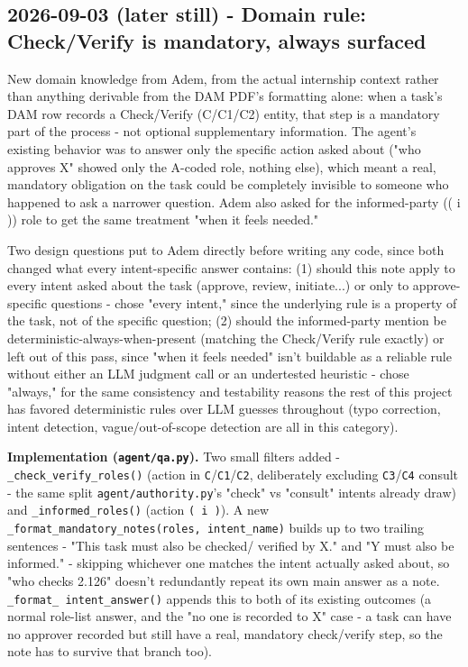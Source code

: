 \subsection*{2026-09-03 (later still) - Domain rule: Check/Verify is mandatory, always surfaced}
New domain knowledge from Adem, from the actual internship context rather than anything derivable from the DAM PDF's formatting alone: when a task's DAM row records a Check/Verify (C/C1/C2) entity, that step is a mandatory part of the process - not optional supplementary information. The agent's existing behavior was to answer only the specific action asked about ("who approves X" showed only the A-coded role, nothing else), which meant a real, mandatory obligation on the task could be completely invisible to someone who happened to ask a narrower question. Adem also asked for the informed-party (( i )) role to get the same treatment "when it feels needed."

Two design questions put to Adem directly before writing any code, since both changed what every intent-specific answer contains: (1) should this note apply to every intent asked about the task (approve, review, initiate...) or only to approve-specific questions - chose "every intent," since the underlying rule is a property of the task, not of the specific question; (2) should the informed-party mention be deterministic-always-when-present (matching the Check/Verify rule exactly) or left out of this pass, since "when it feels needed" isn't buildable as a reliable rule without either an LLM judgment call or an undertested heuristic - chose "always," for the same consistency and testability reasons the rest of this project has favored deterministic rules over LLM guesses throughout (typo correction, intent detection, vague/out-of-scope detection are all in this category).

\textbf{Implementation (\texttt{agent/\allowbreak{}qa.py}).} Two small filters added -\texttt{\_\allowbreak{}check\_\allowbreak{}verify\_\allowbreak{}roles()} (action in \texttt{C}/\texttt{C1}/\texttt{C2}, deliberately excluding \texttt{C3}/\texttt{C4} consult - the same split \texttt{agent/\allowbreak{}authority.py}'s "check" vs "consult" intents already draw) and \texttt{\_\allowbreak{}informed\_\allowbreak{}roles()} (action \texttt{( i )}). A new \texttt{\_\allowbreak{}format\_\allowbreak{}mandatory\_\allowbreak{}notes(roles, intent\_\allowbreak{}name)} builds up to two trailing sentences - "This task must also be checked/ verified by X." and "Y must also be informed." - skipping whichever one matches the intent actually asked about, so "who checks 2.126" doesn't redundantly repeat its own main answer as a note. \texttt{\_\allowbreak{}format\_\allowbreak{} intent\_\allowbreak{}answer()} appends this to both of its existing outcomes (a normal role-list answer, and the "no one is recorded to X" case - a task can have no approver recorded but still have a real, mandatory check/verify step, so the note has to survive that branch too).

